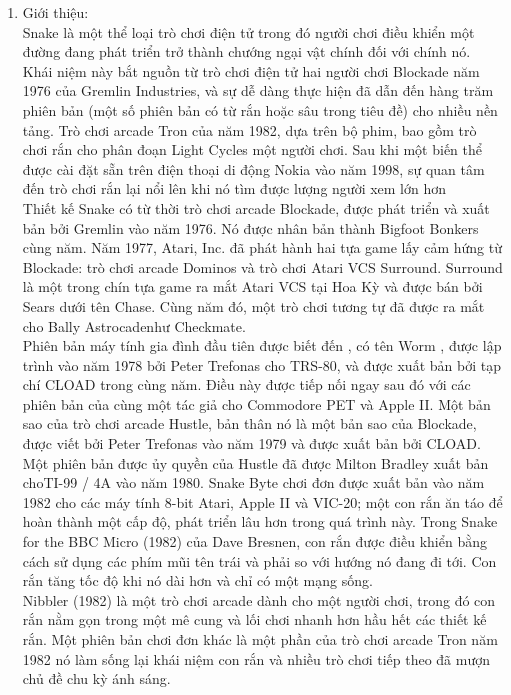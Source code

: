 \documentclass{article}
\begin{document}
\begin{enumerate}
    \item Giới thiệu:\\
    Snake là một thể loại trò chơi điện tử trong đó người chơi điều khiển một đường đang phát triển trở thành chướng ngại vật chính đối với chính nó. Khái niệm này bắt nguồn từ trò chơi điện tử hai người chơi Blockade năm 1976 của Gremlin Industries, và sự dễ dàng thực hiện đã dẫn đến hàng trăm phiên bản (một số phiên bản có từ rắn hoặc sâu trong tiêu đề) cho nhiều nền tảng. Trò chơi arcade Tron của năm 1982, dựa trên bộ phim, bao gồm trò chơi rắn cho phân đoạn Light Cycles một người chơi. Sau khi một biến thể được cài đặt sẵn trên điện thoại di động Nokia vào năm 1998, sự quan tâm đến trò chơi rắn lại nổi lên khi nó tìm được lượng người xem lớn hơn\\
    Thiết kế Snake có từ thời trò chơi arcade Blockade, được phát triển và xuất bản bởi Gremlin vào năm 1976. Nó được nhân bản thành Bigfoot Bonkers cùng năm. Năm 1977, Atari, Inc. đã phát hành hai tựa game lấy cảm hứng từ Blockade: trò chơi arcade Dominos và trò chơi Atari VCS Surround. Surround là một trong chín tựa game ra mắt Atari VCS tại Hoa Kỳ và được bán bởi Sears dưới tên Chase. Cùng năm đó, một trò chơi tương tự đã được ra mắt cho Bally Astrocadenhư Checkmate.\\
    Phiên bản máy tính gia đình đầu tiên được biết đến , có tên Worm , được lập trình vào năm 1978 bởi Peter Trefonas cho TRS-80, và được xuất bản bởi tạp chí CLOAD trong cùng năm. Điều này được tiếp nối ngay sau đó với các phiên bản của cùng một tác giả cho Commodore PET và Apple II. Một bản sao của trò chơi arcade Hustle, bản thân nó là một bản sao của Blockade, được viết bởi Peter Trefonas vào năm 1979 và được xuất bản bởi CLOAD. Một phiên bản được ủy quyền của Hustle đã được Milton Bradley xuất bản choTI-99 / 4A vào năm 1980. Snake Byte chơi đơn được xuất bản vào năm 1982 cho các máy tính 8-bit Atari, Apple II và VIC-20; một con rắn ăn táo để hoàn thành một cấp độ, phát triển lâu hơn trong quá trình này. Trong Snake for the BBC Micro (1982) của Dave Bresnen, con rắn được điều khiển bằng cách sử dụng các phím mũi tên trái và phải so với hướng nó đang đi tới. Con rắn tăng tốc độ khi nó dài hơn và chỉ có một mạng sống.\\
    Nibbler (1982) là một trò chơi arcade dành cho một người chơi, trong đó con rắn nằm gọn trong một mê cung và lối chơi nhanh hơn hầu hết các thiết kế rắn. Một phiên bản chơi đơn khác là một phần của trò chơi arcade Tron năm 1982 nó làm sống lại khái niệm con rắn và nhiều trò chơi tiếp theo đã mượn chủ đề chu kỳ ánh sáng.\\

\end{enumerate}
\end{document}
